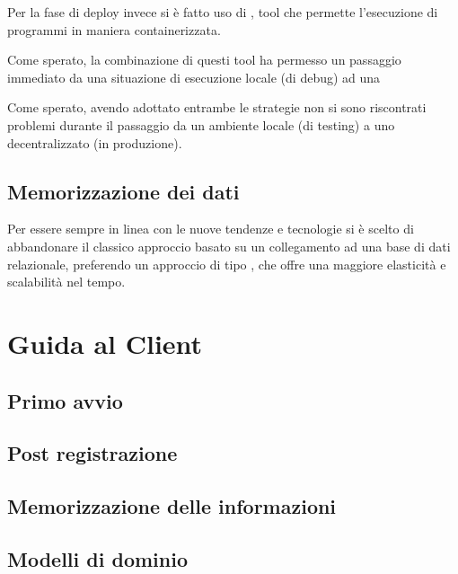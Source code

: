 \documentclass{./document_class}
\begin{document}
          Per la fase di deploy invece si è fatto uso di , tool che permette l'esecuzione di programmi in maniera containerizzata.

          Come sperato, la combinazione di questi tool ha permesso un passaggio immediato da una situazione di esecuzione locale (di debug) ad una 

          Come sperato, avendo adottato entrambe le strategie non si sono riscontrati problemi durante il passaggio da un ambiente locale (di testing) a uno decentralizzato (in produzione).
        \subsection{Memorizzazione dei dati}
            Per essere sempre in linea con le nuove tendenze e tecnologie si è scelto di abbandonare il classico approccio basato su un collegamento ad una base di dati relazionale, preferendo un approccio di tipo \footnotemark {} , che offre una maggiore elasticità e scalabilità nel tempo.
        \newpage
        
      \section{Guida al Client}
        \subsection{Primo avvio}
        \subsection{Post registrazione}
        \subsection{Memorizzazione delle informazioni}
        \subsection{Modelli di dominio}
          \begin{center}
          \end{center}

          \begin{center}
          \end{center}
        \newpage
\end{document}
